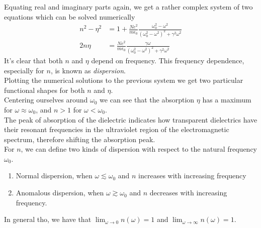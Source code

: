 \documentclass[../electromagnetism.tex]{subfiles}
\begin{document}
Equating real and imaginary parts again, we get a rather complex system of two equations which can be solved numerically
\begin{equation}
	\begin{aligned}
		n^2-\eta^2&= 1+\frac{Ne^2}{m\epsilon_0}\frac{\omega_0^2-\omega^2}{\left( \omega_0^2-\omega^2 \right)^2+\gamma^2\omega^2}\\
		2n\eta&= \frac{Ne^2}{m\epsilon_0}\frac{\gamma\omega}{\left( \omega_0^2-\omega^2 \right)^2+\gamma^2\omega^2}
	\end{aligned}
	\label{eq:dispersion.diff}
\end{equation}
It's clear that both $n$ and $\eta$ depend on frequency. This frequency dependence, especially for $n$, is known as \textit{dispersion}.\\
Plotting the numerical solutions to the previous system we get two particular functional shapes for both $n$ and $\eta$.\\
Centering ourselves around $\omega_0$ we can see that the absorption $\eta$ has a maximum for $\omega\approx\omega_0$, and $n>1$ for $\omega<\omega_0$.\\
The peak of absorption of the dielectric indicates how transparent dielectrics have their resonant frequencies in the ultraviolet region of the electromagnetic spectrum, therefore shifting the absorption peak.\\
For $n$, we can define two kinds of dispersion with respect to the natural frequency $\omega_0$. 
\begin{enumerate}
\item Normal dispersion, when $\omega\lesssim\omega_0$ and $n$ increases with increasing frequency
\item Anomalous dispersion, when $\omega\gtrsim\omega_0$ and $n$ decreases with increasing frequency.
\end{enumerate}
In general tho, we have that $\lim_{\omega\to0}n(\omega)=1$ and $\lim_{\omega\to\infty}n(\omega)=1$.
\end{document}
